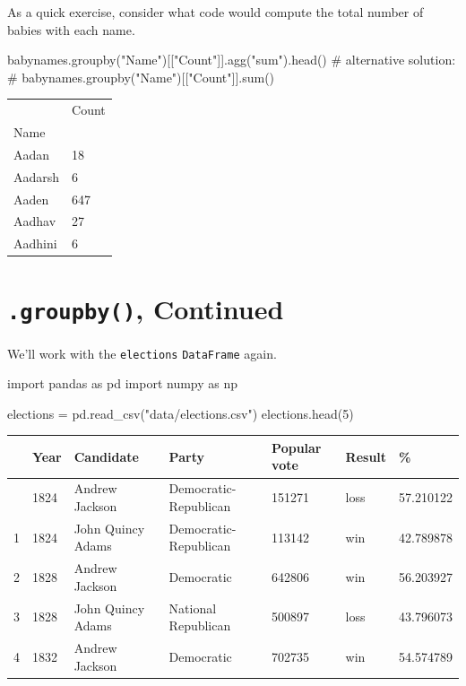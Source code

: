 \documentclass[
  letterpaper,
  DIV=11,
  numbers=noendperiod]{scrreprt}
\newenvironment{Shaded}{\begin{snugshade}}{\end{snugshade}}
\newcommand{\CommentTok}[1]{\textcolor[rgb]{0.37,0.37,0.37}{#1}}
\newcommand{\DecValTok}[1]{\textcolor[rgb]{0.68,0.00,0.00}{#1}}
\newcommand{\ImportTok}[1]{\textcolor[rgb]{0.00,0.46,0.62}{#1}}
\newcommand{\NormalTok}[1]{\textcolor[rgb]{0.00,0.23,0.31}{#1}}
\newcommand{\OperatorTok}[1]{\textcolor[rgb]{0.37,0.37,0.37}{#1}}
\newcommand{\StringTok}[1]{\textcolor[rgb]{0.13,0.47,0.30}{#1}}
\begin{document}
As a quick exercise, consider what code would compute the total number
of babies with each name.

\begin{Shaded}
\begin{Highlighting}[]
\NormalTok{babynames.groupby(}\StringTok{"Name"}\NormalTok{)[[}\StringTok{"Count"}\NormalTok{]].agg(}\StringTok{"sum"}\NormalTok{).head()}
\CommentTok{\# alternative solution: }
\CommentTok{\# babynames.groupby("Name")[["Count"]].sum()}
\end{Highlighting}
\end{Shaded}

\begin{longtable}[]{@{}ll@{}}
\toprule\noalign{}
& Count \\
Name & \\
\midrule\noalign{}
\endhead
\bottomrule\noalign{}
\endlastfoot
Aadan & 18 \\
Aadarsh & 6 \\
Aaden & 647 \\
Aadhav & 27 \\
Aadhini & 6 \\
\end{longtable}

\section{\texorpdfstring{\texttt{.groupby()},
Continued}{.groupby(), Continued}}\label{groupby-continued}

We'll work with the \texttt{elections} \texttt{DataFrame} again.

\begin{Shaded}
\begin{Highlighting}[]
\ImportTok{import}\NormalTok{ pandas }\ImportTok{as}\NormalTok{ pd}
\ImportTok{import}\NormalTok{ numpy }\ImportTok{as}\NormalTok{ np}

\NormalTok{elections }\OperatorTok{=}\NormalTok{ pd.read\_csv(}\StringTok{"data/elections.csv"}\NormalTok{)}
\NormalTok{elections.head(}\DecValTok{5}\NormalTok{)}
\end{Highlighting}
\end{Shaded}

\begin{longtable}[]{@{}lllllll@{}}
\toprule\noalign{}
& Year & Candidate & Party & Popular vote & Result & \% \\
\midrule\noalign{}
\endhead
\bottomrule\noalign{}
\endlastfoot
0 & 1824 & Andrew Jackson & Democratic-Republican & 151271 & loss &
57.210122 \\
1 & 1824 & John Quincy Adams & Democratic-Republican & 113142 & win &
42.789878 \\
2 & 1828 & Andrew Jackson & Democratic & 642806 & win & 56.203927 \\
3 & 1828 & John Quincy Adams & National Republican & 500897 & loss &
43.796073 \\
4 & 1832 & Andrew Jackson & Democratic & 702735 & win & 54.574789 \\
\end{longtable}
\end{document}
